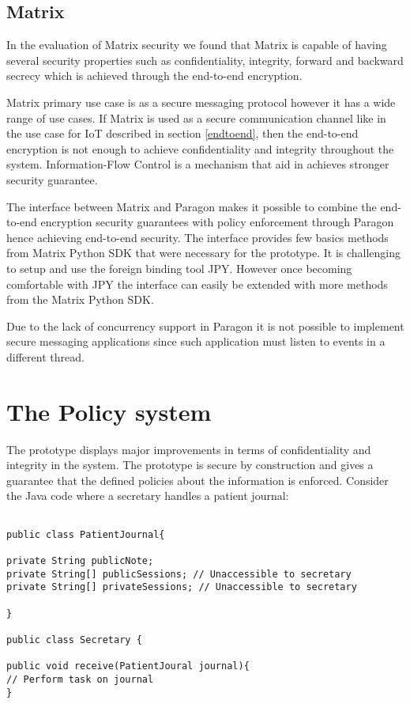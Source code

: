 \subsection{Matrix}

In the evaluation of Matrix security we found that Matrix is capable of having several security properties such as confidentiality, integrity, forward and backward secrecy which is achieved through the end-to-end encryption.

Matrix primary use case is as a secure messaging protocol however it has a wide range of use cases. If Matrix is used as a secure communication channel like in the use case for IoT described in section \ref{endtoend}, then the end-to-end encryption is not enough to achieve confidentiality and integrity throughout the system. Information-Flow Control is a mechanism that aid in achieves stronger security guarantee.

The interface between Matrix and Paragon makes it possible to combine the end-to-end encryption security guarantees with policy enforcement through Paragon hence achieving end-to-end security. The interface provides few basics methods from Matrix Python SDK that were necessary for the prototype. It is challenging to setup and use the foreign binding tool JPY. However once becoming comfortable with JPY the interface can easily be extended with more methods from the Matrix Python SDK.

Due to the lack of concurrency support in Paragon it is not possible to implement secure messaging applications since such application must listen to events in a different thread.


\section{The Policy system}


The prototype displays major improvements in terms of confidentiality and integrity in the system. The prototype is secure by construction and gives a guarantee that the defined policies about the information is enforced. Consider the Java code where a secretary handles a patient journal: 

\begin{lstlisting}

public class PatientJournal{

private String publicNote;
private String[] publicSessions; // Unaccessible to secretary
private String[] privateSessions; // Unaccessible to secretary

}

public class Secretary {

public void receive(PatientJoural journal){
// Perform task on journal
}

\end{lstlisting}

